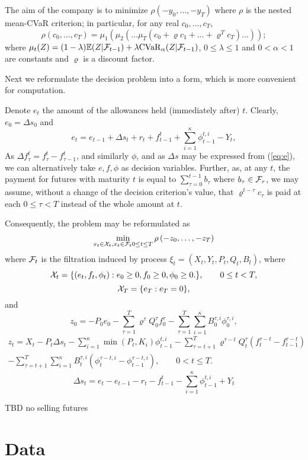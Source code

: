 \documentclass[3p,times]{elsarticle}
\begin{document}
The aim of the company is to minimize $\rho(-y_0,\dots,-y_T)$
where $\rho$ is the nested mean-CVaR criterion; in particular, for any real $c_0,\dots,c_T$,
$$
\rho(c_0,\dots,c_T)=\mu_1(\mu_2(\dots\mu_T(c_0+\varrho c_1+\dots+\varrho ^ T c_T)\dots));
$$
where $\mu_t(Z)=(1-\lambda)\mathbb{E}(Z|\mathcal{F}_{t-1})+\lambda \mathrm{CVaR}_\alpha(Z|\mathcal{F}_{t-1})$, $0\leq \lambda \leq 1$ and $0<\alpha<1$ are constants and $\varrho$ is a discount factor.

Next we reformulate the decision problem into a form, which is more convenient for computation. 

Denote $e_t$ the amount of the allowances held (immediately after) $t$. Clearly, $e_0=\Delta s_0$ and 
\begin{equation}\label{eq:e}
e_t = e_{t-1}+\Delta s_t+r_t +
f_{t-1}^t+\sum_{i=1}^{\kappa}\phi_{t-1}^{t,i}-Y_t,
\end{equation}
As $\Delta f^t_\tau=f^t_\tau-f^t_{\tau-1}$, and similarly $\phi$, and as $\Delta s$ may be expressed from (\ref{eq:e}), we can alternatively take $e,f,\phi$ as decision variables. Further, as, at any $t$, the payment for futures with maturity $t$ is equal to $\sum_{\tau=0}^{t-1} b_\tau$ where $b_\tau \in  \mathcal{F}_\tau$, we may assume, without a change of the decision criterion's value, that $\varrho^{t-\tau}c_\tau$ is paid at each $0\leq \tau < T$ instead of the whole amount at $t$.

Consequently, the problem may be reformulated as
\[
\min_{x_{t}\in\mathcal{X}_{t},x_t \in \mathcal{F}_t 0\leq t\leq T}\rho\left(-z_{0},\dots,-z_{T}\right)
\]
where $\mathcal{F}_t$ is the filtration induced by process
$\xi_{t}=(X_{t},Y_{t},P_{t},Q_{t},B_t)$, where
$$
\mathcal{X}_{t}=\{(e_{t}, f_{t},\phi_{t}): e_0 \geq 0, f_0\geq0,
\phi_{0} \geq0.\},\qquad 0\leq t < T,$$
$$
\mathcal{X}_T = \{e_T:e_T=0\},
$$
and
$$
z_0=-P_0e_0-\sum_{\tau=1}^{T}\varrho^{\tau}Q_0^{\tau} f_0^{\tau}-  \sum_{\tau=1}^{T}\sum_{i=1}^{\kappa}B_0^{\tau,i}\phi_0^{\tau,i}, 
$$
\begin{multline*}
z_t  =X_t-P_t \Delta s_t
-\sum_{i=1}^{\kappa}\min(P_t,K_{i})\phi_{t-1}^{t,i}
-\sum_{\tau=t+1}^{T}\varrho^{\tau-t}Q_t^{\tau}(f_t^{\tau-t}
-f_{t-1}^{\tau-t})
\\-\sum_{\tau=t+1}^{T}\sum_{i=1}^{\kappa}B_t^{\tau,i}
(\phi_t^{\tau-t,i}-\phi_{t-1}^{\tau-t,i}),\qquad 0<t\leq T.
\end{multline*}
$$
\Delta s_t = e_t -e_{t-1}-r_t-
f_{t-1}^t-\sum_{i=1}^{\kappa}\phi_{t-1}^{t,i}+Y_t
$$

TBD no selling futures	
\section{Data}
\end{document}
